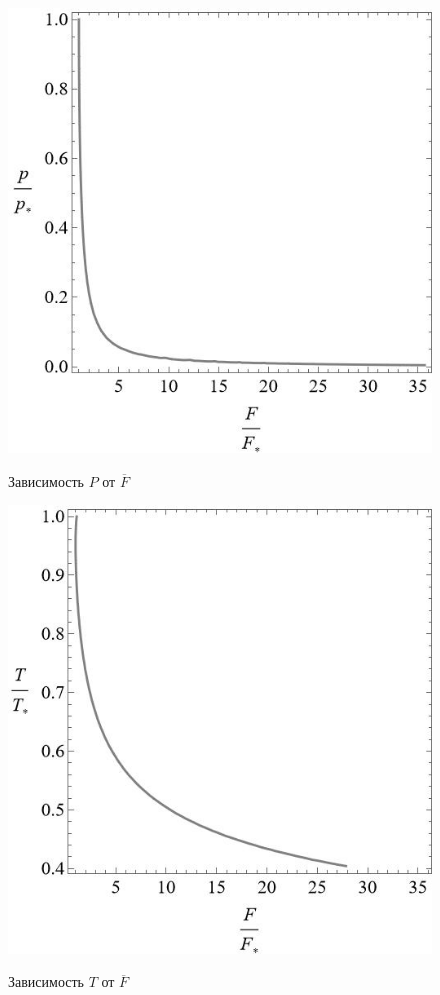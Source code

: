 \documentclass[12pt, a4paper]{article}
\begin{document}
	\begin{figure}[!htbp]
		\centering
		\begin{minipage}[b]{0.4\textwidth}
		{\includegraphics[width=\textwidth, height=\textwidth]{plot1}}
		\caption{Зависимость $P$ от $\overline{F}$}
		\end{minipage}
		\hfill
		\begin{minipage}[b]{0.4\textwidth}
		{\includegraphics[width=\textwidth, height=\textwidth]{plot2}}
		\caption{Зависимость $T$ от $\overline{F}$}
		\end{minipage}
		\label{plot-1-2}
	\end{figure}
\end{document}
